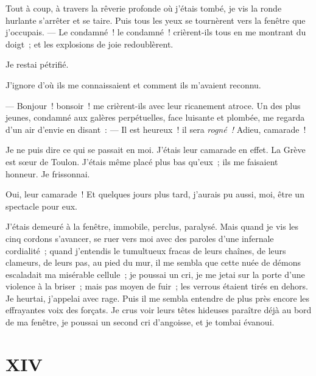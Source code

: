 \documentclass[french,twoside]{book} %
\begin{document}
Tout à coup, à travers la rêverie profonde où j’étais tombé, je vis la ronde hurlante s’arrêter et se taire. Puis tous les yeux se tournèrent vers la fenêtre que j’occupais. — Le condamné ! le condamné ! crièrent-ils tous en me montrant du doigt ; et les explosions de joie redoublèrent.\par
Je restai pétrifié.\par
J’ignore d’où ils me connaissaient et comment ils m’avaient reconnu.\par
— Bonjour ! bonsoir ! me crièrent-ils avec leur ricanement atroce. Un des plus jeunes, condamné aux galères perpétuelles, face luisante et plombée, me regarda d’un air d’envie en disant : — Il est heureux ! il sera \emph{rogné !} Adieu, camarade !\par
Je ne puis dire ce qui se passait en moi. J’étais leur camarade en effet. La Grève est sœur de Toulon. J’étais même placé plus bas qu’eux ; ils me faisaient honneur. Je frissonnai.\par
 Oui, leur camarade ! Et quelques jours plus tard, j’aurais pu aussi, moi, être un spectacle pour eux.\par
J’étais demeuré à la fenêtre, immobile, perclus, paralysé. Mais quand je vis les cinq cordons s’avancer, se ruer vers moi avec des paroles d’une infernale cordialité ; quand j’entendis le tumultueux fracas de leurs chaînes, de leurs clameurs, de leurs pas, au pied du mur, il me sembla que cette nuée de démons escaladait ma misérable cellule ; je poussai un cri, je me jetai sur la porte d’une violence à la briser ; mais pas moyen de fuir ; les verrous étaient tirés en dehors. Je heurtai, j’appelai avec rage. Puis il me sembla entendre de plus près encore les effrayantes voix des forçats. Je crus voir leurs têtes hideuses paraître déjà au bord de ma fenêtre, je poussai un second cri d’angoisse, et je tombai évanoui.
 \section[{XIV}]{XIV}
\label{ch14}\renewcommand{\leftmark}{XIV}
\end{document}
